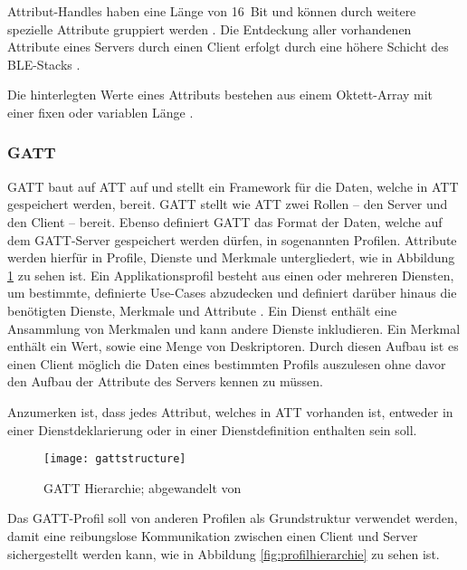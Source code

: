 Attribut-Handles haben eine Länge von 16~Bit und können durch weitere spezielle Attribute gruppiert werden \cite[S.~1412f.]{bluetoothCore}. Die Entdeckung aller vorhandenen Attribute eines Servers durch einen Client erfolgt durch eine höhere Schicht des \ac{BLE}-Stacks \cite[S.~1410]{bluetoothCore}.

Die hinterlegten Werte eines Attributs bestehen aus einem Oktett-Array mit einer fixen oder variablen Länge \cite[S.~1413]{bluetoothCore}.

\subsubsection{\acf{GATT}}
\ac{GATT} baut auf \ac{ATT} auf und stellt ein Framework für die Daten, welche in \ac{ATT} gespeichert werden, bereit. \ac{GATT} stellt wie \ac{ATT} zwei Rollen -- den Server und den Client -- bereit. Ebenso definiert \ac{GATT} das Format der Daten, welche auf dem \ac{GATT}-Server gespeichert werden dürfen, in sogenannten Profilen. Attribute werden hierfür in Profile, Dienste und Merkmale untergliedert, wie in Abbildung \ref{fig:gattstructure} zu sehen ist. Ein Applikationsprofil besteht aus einen oder mehreren Diensten, um bestimmte, definierte Use-Cases abzudecken und definiert darüber hinaus die benötigten Dienste, Merkmale und Attribute \cite[S.~207]{bluetoothCore}. Ein Dienst enthält eine Ansammlung von Merkmalen und kann andere Dienste inkludieren. Ein Merkmal enthält ein Wert, sowie eine Menge von Deskriptoren. Durch diesen Aufbau ist es einen Client möglich die Daten eines bestimmten Profils auszulesen ohne davor den Aufbau der Attribute des Servers kennen zu müssen. \cite[S.~280, S.~1480]{bluetoothCore}

Anzumerken ist, dass jedes Attribut, welches in \ac{ATT} vorhanden ist, entweder in einer Dienstdeklarierung oder in einer Dienstdefinition enthalten sein soll. \cite[S.~1483]{bluetoothCore}

\begin{figure}[h]
    \centering
    \texttt{[image: gattstructure]}
    \caption{\acs{GATT} Hierarchie; abgewandelt von \cite[S.~281]{bluetoothCore}}
    \label{fig:gattstructure}
\end{figure}

Das \ac{GATT}-Profil soll von anderen Profilen als Grundstruktur verwendet werden, damit eine reibungslose Kommunikation zwischen einen Client und Server sichergestellt werden kann, wie in Abbildung \ref{fig:profilhierarchie} zu sehen ist. \cite[S.~1470]{bluetoothCore}

